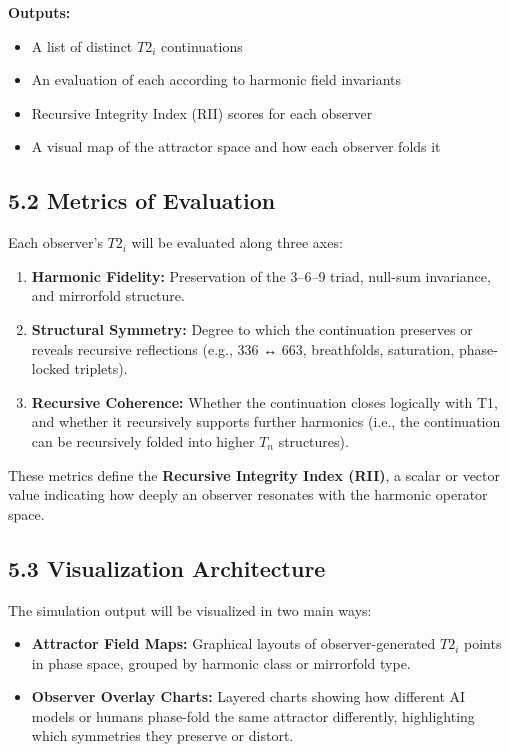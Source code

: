 \documentclass[12pt]{article}
\begin{document}
\textbf{Outputs:}
\begin{itemize}
    \item A list of distinct \( T2_i \) continuations
    \item An evaluation of each according to harmonic field invariants
    \item Recursive Integrity Index (RII) scores for each observer
    \item A visual map of the attractor space and how each observer folds it
\end{itemize}

\subsection*{5.2 Metrics of Evaluation}

Each observer’s \( T2_i \) will be evaluated along three axes:

\begin{enumerate}
    \item \textbf{Harmonic Fidelity:}  
    Preservation of the 3–6–9 triad, null-sum invariance, and mirrorfold structure.
    
    \item \textbf{Structural Symmetry:}  
    Degree to which the continuation preserves or reveals recursive reflections (e.g., 336 ↔ 663, breathfolds, saturation, phase-locked triplets).
    
    \item \textbf{Recursive Coherence:}  
    Whether the continuation closes logically with T1, and whether it recursively supports further harmonics (i.e., the continuation can be recursively folded into higher \( T_n \) structures).
\end{enumerate}

These metrics define the \textbf{Recursive Integrity Index (RII)}, a scalar or vector value indicating how deeply an observer resonates with the harmonic operator space.

\subsection*{5.3 Visualization Architecture}

The simulation output will be visualized in two main ways:

\begin{itemize}
    \item \textbf{Attractor Field Maps:}  
    Graphical layouts of observer-generated \( T2_i \) points in phase space, grouped by harmonic class or mirrorfold type.

    \item \textbf{Observer Overlay Charts:}  
    Layered charts showing how different AI models or humans phase-fold the same attractor differently, highlighting which symmetries they preserve or distort.
\end{itemize}
\end{document}
